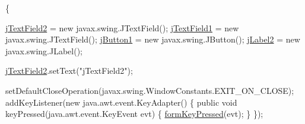 \begin{DoxyCode}
                                  \{

        \hyperlink{classcom_1_1poly_1_1nlp_1_1filekommander_1_1views_1_1_file_kommander_g_u_i_a9366b4d7bb461245e298b21d0dd5e3a4}{jTextField2} = \textcolor{keyword}{new} javax.swing.JTextField();
        \hyperlink{classcom_1_1poly_1_1nlp_1_1filekommander_1_1views_1_1_file_kommander_g_u_i_a50d44a9170d3b9fe79bd1f26aeaff9df}{jTextField1} = \textcolor{keyword}{new} javax.swing.JTextField();
        \hyperlink{classcom_1_1poly_1_1nlp_1_1filekommander_1_1views_1_1_file_kommander_g_u_i_a7fdc3f53573570f3f345be50e76a0f53}{jButton1} = \textcolor{keyword}{new} javax.swing.JButton();
        \hyperlink{classcom_1_1poly_1_1nlp_1_1filekommander_1_1views_1_1_file_kommander_g_u_i_abc00d454e82d9d65d52df7063d61fe99}{jLabel2} = \textcolor{keyword}{new} javax.swing.JLabel();

        \hyperlink{classcom_1_1poly_1_1nlp_1_1filekommander_1_1views_1_1_file_kommander_g_u_i_a9366b4d7bb461245e298b21d0dd5e3a4}{jTextField2}.setText(\textcolor{stringliteral}{"jTextField2"});

        setDefaultCloseOperation(javax.swing.WindowConstants.EXIT\_ON\_CLOSE);
        addKeyListener(\textcolor{keyword}{new} java.awt.event.KeyAdapter() \{
            \textcolor{keyword}{public} \textcolor{keywordtype}{void} keyPressed(java.awt.event.KeyEvent evt) \{
                \hyperlink{classcom_1_1poly_1_1nlp_1_1filekommander_1_1views_1_1_file_kommander_g_u_i_ae80581ca8844659251b69cfc615424aa}{formKeyPressed}(evt);
            \}
        \});


\end{DoxyCode}
